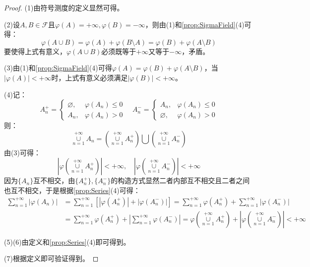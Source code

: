 \begin{proof}
	(1)由符号测度的定义显然可得。\par
	(2)设$A,B\in\mathscr{F}$且$\varphi(A)=+\infty,\varphi(B)=-\infty$，则由(1)和\cref{prop:SigmaField}(4)可得：
	\begin{equation*}
		\varphi(A\cup B)=\varphi(A)+\varphi(B\setminus A)=\varphi(B)+\varphi(A\setminus B)
	\end{equation*}
	要使得上式有意义，$\varphi(A\cup B)$必须既等于$+\infty$又等于$-\infty$，矛盾。\par
	(3)由(1)和\cref{prop:SigmaField}(4)可得$\varphi(A)=\varphi(B)+\varphi(A\setminus B)$，当$|\varphi(A)|<+\infty$时，上式有意义必须满足$|\varphi(B)|<+\infty$。\par
	(4)记：
	\begin{equation*}
		A_n^+=
		\begin{cases}
			\varnothing,&\varphi(A_n)\leqslant0 \\
			A_n,&\varphi(A_n)>0
		\end{cases}
		\quad
		A_n^-=
		\begin{cases}
			A_n,&\varphi(A_n)\leqslant0 \\
			\varnothing,&\varphi(A_n)>0
		\end{cases}
	\end{equation*}
	则：
	\begin{equation*}
		\underset{n=1}{\overset{+\infty}{\cup}}A_n=\left(\underset{n=1}{\overset{+\infty}{\cup}}A_n^+\right)\bigcup\left(\underset{n=1}{\overset{+\infty}{\cup}}A_n^-\right)
	\end{equation*}
	由(3)可得：
	\begin{equation*}
		\left|\varphi\left(\underset{n=1}{\overset{+\infty}{\cup}}A_n^+\right)\right|<+\infty,\quad
		\left|\varphi\left(\underset{n=1}{\overset{+\infty}{\cup}}A_n^-\right)\right|<+\infty
	\end{equation*}
	因为$\{A_n\}$互不相交，由$\{A_n^+\},\{A_n^-\}$的构造方式显然二者内部互不相交且二者之间也互不相交，于是根据\cref{prop:Series}(4)可得：
	\begin{align*}
		\sum_{n=1}^{+\infty}|\varphi(A_n)|&=\sum_{n=1}^{+\infty}[|\varphi(A_n^+)|+|\varphi(A_n^-)|] =\sum_{n=1}^{+\infty}\varphi(A_n^+)+\sum_{n=1}^{+\infty}|\varphi(A_n^-)| \\
		&=\sum_{n=1}^{+\infty}\varphi(A_n^+)+\left|\sum_{n=1}^{+\infty}\varphi(A_n^-)\right|
		=\varphi\left(\underset{n=1}{\overset{+\infty}{\cup}}A_n^+\right)+\left|\varphi\left(\underset{n=1}{\overset{+\infty}{\cup}}A_n^-\right)\right|<+\infty
	\end{align*}\par
	(5)(6)由定义和\cref{prop:Series}(4)即可得到。\par
	(7)根据定义即可验证得到。
\end{proof}
